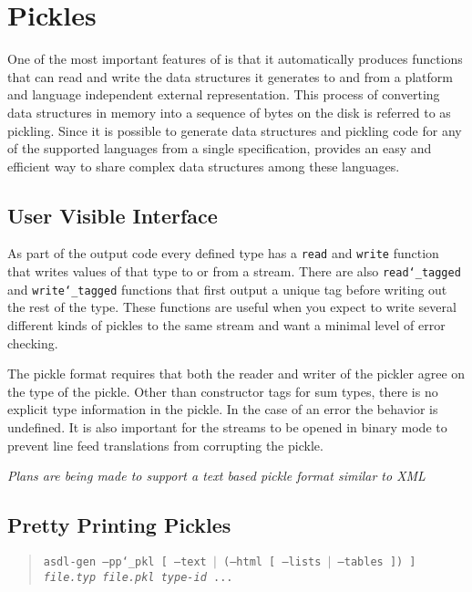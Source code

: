 %
\chapter{Pickles}
\label{sec:pickles}

One of the most important features of \asdlgen{} is that it automatically
produces functions that can read and write the data structures it generates
to and from a platform and language independent external
representation. This process of converting data structures in memory into a
sequence of bytes on the disk is referred to as pickling.
Since it is possible to generate data structures and pickling code for
any of the supported languages from a single \asdl{} specification,
\asdlgen{} provides an easy
and efficient way to share complex data structures among these languages.

\section{User Visible Interface}
As part of the output code every defined type has a \texttt{read} and \texttt{write}
function that writes values of that type to or from a stream. There are also
\texttt{read\char`\_tagged} and \texttt{write\char`\_tagged} functions that first output a unique
tag before writing out the rest of the type. These functions are useful when
you expect to write several different kinds of pickles to the same stream
and want a minimal level of error checking. 

The \asdl{} pickle format requires that both the reader and writer
of the pickler agree on the type of the pickle. Other than constructor tags
for sum types, there is no explicit type information in the pickle. In the
case of an error the behavior is undefined. It is also important for the
streams to be opened in binary mode to prevent line feed translations from
corrupting the pickle. 

\emph{Plans are being made to support a text based pickle format similar to
XML}

\section{Pretty Printing Pickles}
\begin{quote}
  \texttt{asdl-gen --pp\char`\_pkl [ --text $|$ (--html [ --lists $|$ --tables ]) ] \textit{file.typ}
    \textit{file.pkl} \textit{type-id} ...}
\end{quote}%

